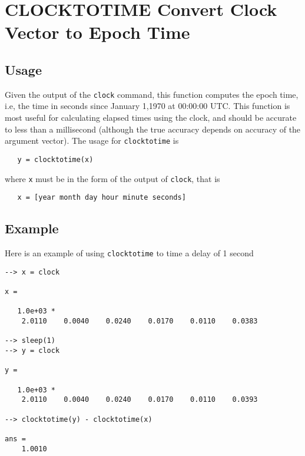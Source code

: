\section{CLOCKTOTIME Convert Clock Vector to Epoch Time}

\subsection{Usage}

Given the output of the \verb|clock| command, this function computes
the epoch time, i.e, the time in seconds since January 1,1970 
at 00:00:00 UTC.  This function is most useful for calculating elapsed
times using the clock, and should be accurate to less than a millisecond
(although the true accuracy depends on accuracy of the argument vector). 
The usage for \verb|clocktotime| is
\begin{verbatim}
   y = clocktotime(x)
\end{verbatim}
where \verb|x| must be in the form of the output of \verb|clock|, that is
\begin{verbatim}
   x = [year month day hour minute seconds]
\end{verbatim}
\subsection{Example}

Here is an example of using \verb|clocktotime| to time a delay of 1 second
\begin{verbatim}
--> x = clock

x = 

   1.0e+03 * 
    2.0110    0.0040    0.0240    0.0170    0.0110    0.0383 

--> sleep(1)
--> y = clock

y = 

   1.0e+03 * 
    2.0110    0.0040    0.0240    0.0170    0.0110    0.0393 

--> clocktotime(y) - clocktotime(x)

ans = 
    1.0010 
\end{verbatim}
